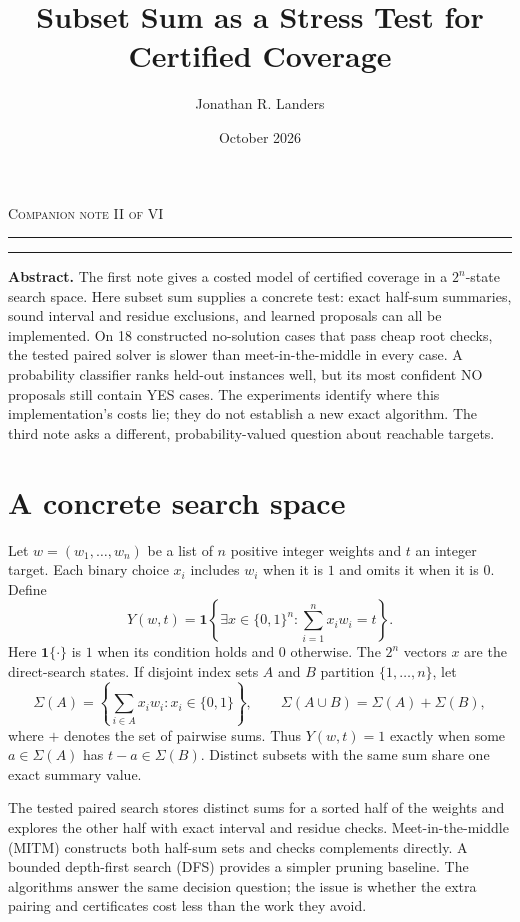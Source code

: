 \documentclass[10pt,english]{article}
\title{\sffamily\bfseries Subset Sum as a Stress Test for Certified Coverage}
\author{Jonathan R. Landers}
\date{October 2026}
\begin{document}
\maketitle
\vspace{-1em}
\noindent\textcolor{paperaccent}{\footnotesize\textsc{Companion note II of VI}}
\par\noindent\textcolor{paperaccent}{\rule{.11\linewidth}{1.5pt}}\textcolor{paperline}{\rule{.89\linewidth}{.45pt}}
\vspace{.65em}

\begin{tcolorbox}[accentbox]
\textbf{Abstract.} The first note gives a costed model of certified coverage in a \(2^n\)-state search space. Here subset sum supplies a concrete test: exact half-sum summaries, sound interval and residue exclusions, and learned proposals can all be implemented. On 18 constructed no-solution cases that pass cheap root checks, the tested paired solver is slower than meet-in-the-middle in every case. A probability classifier ranks held-out instances well, but its most confident NO proposals still contain YES cases. The experiments identify where this implementation's costs lie; they do not establish a new exact algorithm. The third note asks a different, probability-valued question about reachable targets.
\end{tcolorbox}

\section{A concrete search space}
Let \(w=(w_1,\ldots,w_n)\) be a list of \(n\) positive integer weights
and \(t\) an integer target. Each binary choice \(x_i\) includes
\(w_i\) when it is \(1\) and omits it when it is \(0\). Define
\[
Y(w,t)=\mathbf{1}\!\left\{\exists x\in\{0,1\}^n:\sum_{i=1}^{n}x_iw_i=t\right\}.
\]
Here \(\mathbf{1}\{\cdot\}\) is \(1\) when its condition holds and \(0\)
otherwise. The \(2^n\) vectors \(x\) are the direct-search states. If
disjoint index sets \(A\) and \(B\) partition \(\{1,\ldots,n\}\), let
\[
\Sigma(A)=\left\{\sum_{i\in A}x_iw_i:x_i\in\{0,1\}\right\},
\qquad
\Sigma(A\cup B)=\Sigma(A)+\Sigma(B),
\]
where \(+\) denotes the set of pairwise sums. Thus \(Y(w,t)=1\) exactly when some \(a\in\Sigma(A)\) has \(t-a\in\Sigma(B)\). Distinct subsets with the same sum share one exact summary value.

The tested paired search stores distinct sums for a sorted half of the weights and explores the other half with exact interval and residue checks. Meet-in-the-middle (MITM) constructs both half-sum sets and checks complements directly. A bounded depth-first search (DFS) provides a simpler pruning baseline. The algorithms answer the same decision question; the issue is whether the extra pairing and certificates cost less than the work they avoid.
\end{document}
